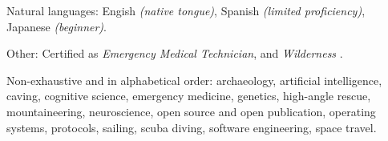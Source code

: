 \documentclass[10pt,letterpaper]{article}
\begin{document}
\vspace{0.5em}
\inlineheadsection
  {Natural languages:}
  {Engish \emph{(native tongue)}, Spanish \emph{(limited proficiency)}, Japanese \emph{(beginner)}.}

\vspace{0.5em}
\inlineheadsection
  {Other:}
  {Certified as \emph{Emergency Medical Technician}, and \emph{Wilderness }.}

\spacedhrule{1.6em}{-0.4em}


\inlineheadsection
  {Non-exhaustive and in alphabetical order:}
  {archaeology, artificial intelligence, caving, cognitive science, emergency medicine, genetics, high-angle rescue, mountaineering, neuroscience, open source and open publication, operating systems, protocols, sailing, scuba diving, software engineering, space travel.}
\end{document}
